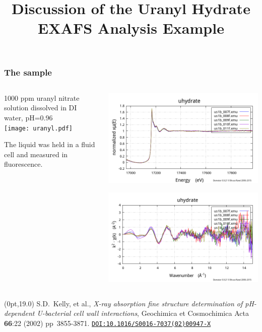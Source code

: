 \documentclass[10pt, xcolor=x11names, compress]{beamer}
\title{Discussion of the Uranyl Hydrate EXAFS Analysis Example}
\begin{document}
\maketitle


\begin{frame}
  \frametitle{The sample}
  \begin{columns}[T]
    \begin{column}{0.5\linewidth}
      1000 ppm uranyl nitrate solution dissolved in DI water, pH=0.96\\[3ex]

      \texttt{[image: uranyl.pdf]}

      \bigskip

      The liquid was held in a fluid cell and measured in fluorescence.
    \end{column}
    \begin{column}{0.5\linewidth}
      \includegraphics[width=\linewidth]{images/uhydrate_mu.png}

      \includegraphics[width=\linewidth]{images/uhydrate_chi.png}
    \end{column}
  \end{columns}

  \begin{textblock*}{0.7\linewidth}(0pt,19.0\TPVertModule)%
    \tiny%
    S.D.\ Kelly, et al., \textit{X-ray absorption fine structure
      determination of pH-dependent U-bacterial cell wall
      interactions}, Geochimica et Cosmochimica Acta \textbf{66}:22
    (2002) pp\  3855-3871.
    \href{http://dx.doi.org/10.1016/S0016-7037(02)00947-X}
    {\color{Blue4}\texttt{DOI:10.1016/S0016-7037(02)00947-X}}
  \end{textblock*}
\end{frame}
\end{document}
